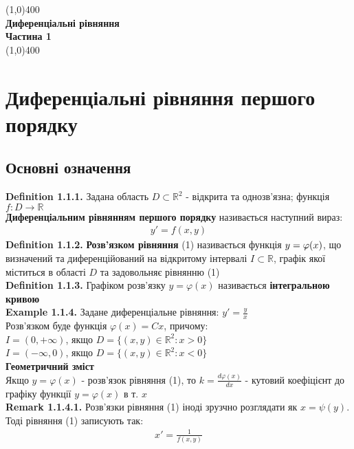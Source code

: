 \documentclass[a4paper, 14pt]{extarticle}
\def\defin#1{\textbf{Definition {#1}}}
\def\ex#1{\textbf{Example {#1}}}
\def\rm#1{\textbf{Remark {#1}}}
\def\bigline{\vspace{5mm}\\}
\begin{document}
	\begin{titlepage}
		\begin{center}
		\hfill
		\vfill
		\line(1,0){400}\\
		\large{\textbf{Диференціальні рівняння}}\\[1mm]
		{\textbf{Частина 1}}\\[1mm]
		\line(1,0){400}\\
		\vfill
        	\end{center}
    	\end{titlepage}
\tableofcontents
\newpage
    	
	\section{Диференціальні рівняння першого порядку}
	\subsection{Основні означення}
	\defin{1.1.1.} Задана область $D \subset \mathbb{R}^2$ - відкрита та однозв'язна; функція $f: D \rightarrow \mathbb{R}$\\
	\textbf{Диференціальним рівнянням першого порядку} називається наступний вираз:
	\begin{align}
	y' = f(x,y)
	\end{align}
	\defin{1.1.2.} \textbf{Розв'язком рівняння} (1) називається функція $\\ y= \varphi(x)$, що визначений та диференційований на відкритому інтервалі $I \subset \mathbb{R}$, графік якої міститься в області $D$ та задовольняє рівнянню (1)
	\bigline
	\defin{1.1.3.} Графіком розв'язку $y = \varphi(x)$ називається \textbf{інтегральною кривою}
	\bigline
	\ex{1.1.4.} Задане диференціальне рівняння: $\displaystyle y' = \frac{y}{x}$\\
	Розв'язком буде функція $\varphi(x)=Cx$, причому:\\
	$I=(0, +\infty)$, якщо $D=\{(x,y) \in \mathbb{R}^2: x>0\}$\\
	$I=(-\infty, 0)$, якщо $D=\{(x,y) \in \mathbb{R}^2: x<0\}$
	\bigline
	\textbf{Геометричний зміст}\\
	Якщо $y=\varphi(x)$ - розв'язок рівняння (1), то $\displaystyle k = \frac{d\varphi(x)}{dx}$ - кутовий коефіцієнт до графіку функції $y=\varphi(x)$ в т. $x$
	\bigline
	\rm{1.1.4.1.} Розв'язки рівняння (1) іноді зрузчно розглядати як $x=\psi(y)$. Тоді рівняння (1) записують так:
	\begin{align*}
	x'=\frac{1}{f(x,y)}
	\end{align*}
\end{document}
